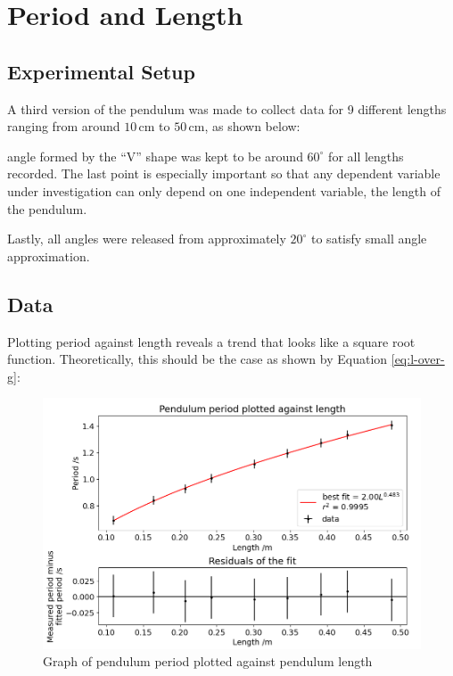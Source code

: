\documentclass[12pt]{article}
\begin{document}
{\color{blue}

\section{Period and Length} \label{Period and Length}

\subsection{Experimental Setup}
A third version of the pendulum was made to collect data for 9 different lengths ranging from around $10\,$cm to $50\,$cm, as shown below:


angle formed by the ``V'' shape was kept to be around $60^\circ$ for all lengths recorded. The last point is especially important so that any dependent variable under investigation can only depend on one independent variable, the length of the pendulum.

Lastly, all angles were released from approximately $20^\circ$ to satisfy small angle approximation.

\subsection{Data}
Plotting period against length reveals a trend that looks like a square root function. Theoretically, this should be the case as shown by Equation \ref{eq:l-over-g}:

\begin{figure}[!hptb]
    \centering
    \includegraphics[width=\textwidth]{../figures/period_vs_length.png}
    \caption{Graph of pendulum period plotted against pendulum length}
    \label{fig:figure 6}
\end{figure}

}
\end{document}
